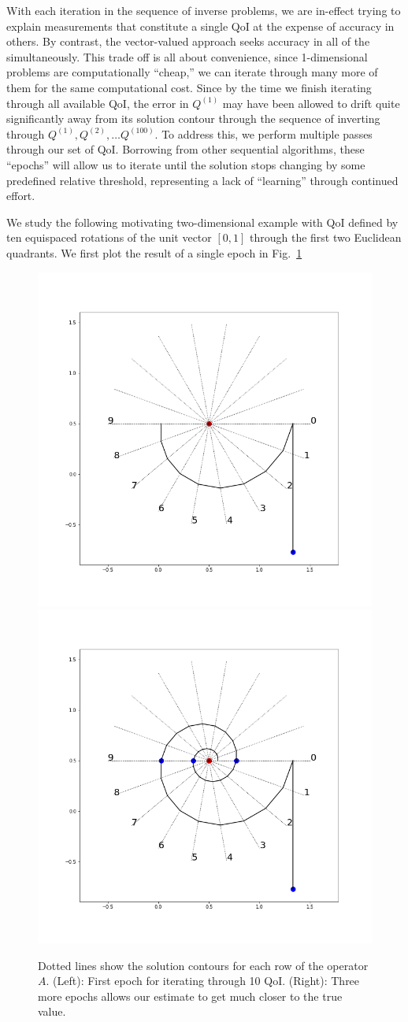 With each iteration in the sequence of inverse problems, we are in-effect trying to explain measurements that constitute a single QoI at the expense of accuracy in others.
By contrast, the vector-valued approach seeks accuracy in all of the simultaneously.
This trade off is all about convenience, since 1-dimensional problems are computationally ``cheap,'' we can iterate through many more of them for the same computational cost.
Since by the time we finish iterating through all available QoI, the error in $Q^{(1)}$ may have been allowed to drift quite significantly away from its solution contour through the sequence of inverting through $Q^{(1)}, Q^{(2)}, \dots Q^{(100)}$.
To address this, we perform multiple passes through our set of QoI.
Borrowing from other sequential algorithms, these ``epochs'' will allow us to iterate until the solution stops changing by some predefined relative threshold, representing a lack of ``learning'' through continued effort.

We study the following motivating two-dimensional example with QoI defined by ten equispaced rotations of the unit vector $[0, 1]$ through the first two Euclidean quadrants.
We first plot the result of a single epoch in Fig.~\ref{fig:iterative-linear-demo}
\begin{figure}
  \centering
  \includegraphics[width=0.475\linewidth]{examples/iterative/10D-firstepoch}
  \includegraphics[width=0.475\linewidth]{examples/iterative/10D-fewepochs}

  \caption{
  Dotted lines show the solution contours for each row of the operator $A$.
  (Left): First epoch for iterating through 10 QoI.
  (Right): Three more epochs allows our estimate to get much closer to the true value.
  }
  \label{fig:iterative-linear-demo}
\end{figure}

